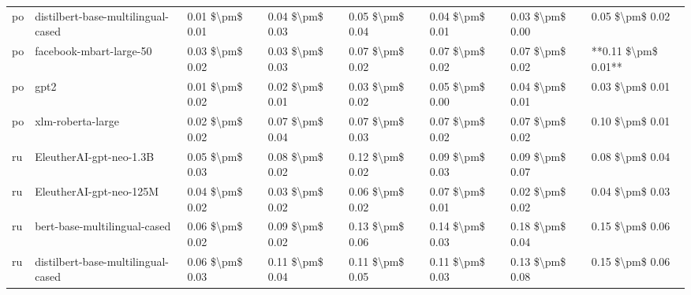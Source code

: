 \begin{tabular}{llllllll}
      po & distilbert-base-multilingual-cased & 0.01 \$\textbackslash pm\$ 0.01 &           0.04 \$\textbackslash pm\$ 0.03 &       0.05 \$\textbackslash pm\$ 0.04 &        0.04 \$\textbackslash pm\$ 0.01 &                         0.03 \$\textbackslash pm\$ 0.00 &     0.05 \$\textbackslash pm\$ 0.02 \\
      po &            facebook-mbart-large-50 & 0.03 \$\textbackslash pm\$ 0.02 &           0.03 \$\textbackslash pm\$ 0.03 &       0.07 \$\textbackslash pm\$ 0.02 &        0.07 \$\textbackslash pm\$ 0.02 &                         0.07 \$\textbackslash pm\$ 0.02 & **0.11 \$\textbackslash pm\$ 0.01** \\
      po &                               gpt2 & 0.01 \$\textbackslash pm\$ 0.02 &           0.02 \$\textbackslash pm\$ 0.01 &       0.03 \$\textbackslash pm\$ 0.02 &        0.05 \$\textbackslash pm\$ 0.00 &                         0.04 \$\textbackslash pm\$ 0.01 &     0.03 \$\textbackslash pm\$ 0.01 \\
      po &                  xlm-roberta-large & 0.02 \$\textbackslash pm\$ 0.02 &           0.07 \$\textbackslash pm\$ 0.04 &       0.07 \$\textbackslash pm\$ 0.03 &        0.07 \$\textbackslash pm\$ 0.02 &                         0.07 \$\textbackslash pm\$ 0.02 &     0.10 \$\textbackslash pm\$ 0.01 \\
      ru &            EleutherAI-gpt-neo-1.3B & 0.05 \$\textbackslash pm\$ 0.03 &           0.08 \$\textbackslash pm\$ 0.02 &       0.12 \$\textbackslash pm\$ 0.02 &        0.09 \$\textbackslash pm\$ 0.03 &                         0.09 \$\textbackslash pm\$ 0.07 &     0.08 \$\textbackslash pm\$ 0.04 \\
      ru &            EleutherAI-gpt-neo-125M & 0.04 \$\textbackslash pm\$ 0.02 &           0.03 \$\textbackslash pm\$ 0.02 &       0.06 \$\textbackslash pm\$ 0.02 &        0.07 \$\textbackslash pm\$ 0.01 &                         0.02 \$\textbackslash pm\$ 0.02 &     0.04 \$\textbackslash pm\$ 0.03 \\
      ru &       bert-base-multilingual-cased & 0.06 \$\textbackslash pm\$ 0.02 &           0.09 \$\textbackslash pm\$ 0.02 &       0.13 \$\textbackslash pm\$ 0.06 &        0.14 \$\textbackslash pm\$ 0.03 &                         0.18 \$\textbackslash pm\$ 0.04 &     0.15 \$\textbackslash pm\$ 0.06 \\
      ru & distilbert-base-multilingual-cased & 0.06 \$\textbackslash pm\$ 0.03 &           0.11 \$\textbackslash pm\$ 0.04 &       0.11 \$\textbackslash pm\$ 0.05 &        0.11 \$\textbackslash pm\$ 0.03 &                         0.13 \$\textbackslash pm\$ 0.08 &     0.15 \$\textbackslash pm\$ 0.06 \\

\end{tabular}
